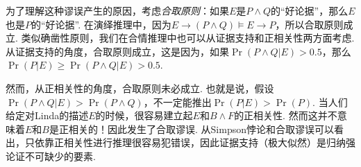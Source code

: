 为了理解这种谬误产生的原因，考虑\emph{合取原则}：如果$E$是$P\wedge Q$的``好论据''，那么$E$也是$P$的``好论据''. 在演绎推理中，因为$E\to(P\wedge Q)\models E\to P$，所以合取原则成立. 类似确凿性原则，我们在合情推理中也可以从证据支持和正相关性两方面考虑. 从证据支持的角度，合取原则成立，这是因为，如果$\Pr(P\wedge Q|E)>0.5$，那么$\Pr(P|E)\geq \Pr(P\wedge Q|E)>0.5$.

然而，从正相关性的角度，合取原则未必成立. 也就是说，假设$\Pr(P\wedge Q|E)>\Pr(P\wedge Q)$，不一定能推出$\Pr(P|E)>\Pr(P)$. 当人们给定对Linda的描述$E$的时候，很容易建立起$E$和$B\wedge F$的正相关性. 然而这并不意味着$E$和$B$是正相关的！因此发生了合取谬误. 从Simpson悖论和合取谬误可以看出，只依靠正相关性进行推理很容易犯错误，因此证据支持（极大似然）是归纳强论证不可缺少的要素.